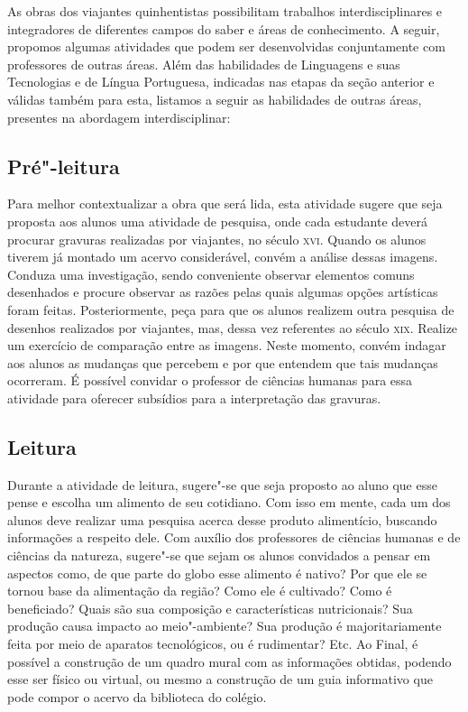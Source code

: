 \documentclass[12pt]{extarticle}
\begin{document}
As obras dos viajantes quinhentistas possibilitam trabalhos
interdisciplinares e integradores de diferentes campos do saber e áreas
de conhecimento. A seguir, propomos algumas atividades que podem ser
desenvolvidas conjuntamente com professores de outras áreas. Além das
habilidades de Linguagens e suas Tecnologias e de Língua Portuguesa,
indicadas nas etapas da seção anterior e válidas também para esta,
listamos a seguir as habilidades de outras áreas, presentes na abordagem
interdisciplinar:


\subsection{Pré"-leitura}

Para melhor contextualizar a obra que será lida, esta
atividade sugere que seja proposta aos alunos uma atividade de pesquisa,
onde cada estudante deverá procurar gravuras realizadas por viajantes,
no século \textsc{xvi}. Quando os alunos tiverem já montado um acervo
considerável, convém a análise dessas imagens. Conduza uma investigação,
sendo conveniente observar elementos comuns desenhados e procure
observar as razões pelas quais algumas opções artísticas foram feitas.
Posteriormente, peça para que os alunos realizem outra pesquisa de
desenhos realizados por viajantes, mas, dessa vez referentes ao século
\textsc{xix}. Realize um exercício de comparação entre as imagens. Neste momento,
convém indagar aos alunos as mudanças que percebem e por que entendem
que tais mudanças ocorreram. É possível convidar o professor de ciências
humanas para essa atividade para oferecer subsídios para a interpretação
das gravuras.

\subsection{Leitura}

Durante a atividade de leitura, sugere"-se que seja proposto ao aluno que
esse pense e escolha um alimento de seu cotidiano. Com isso em mente,
cada um dos alunos deve realizar uma pesquisa acerca desse produto
alimentício, buscando informações a respeito dele. Com auxílio dos
professores de ciências humanas e de ciências da natureza, sugere"-se que
sejam os alunos convidados a pensar em aspectos como, de que parte do
globo esse alimento é nativo? Por que ele se tornou base da alimentação
da região? Como ele é cultivado? Como é beneficiado? Quais são sua
composição e características nutricionais? Sua produção causa impacto ao
meio"-ambiente? Sua produção é majoritariamente feita por meio de
aparatos tecnológicos, ou é rudimentar? Etc. Ao Final, é possível a
construção de um quadro mural com as informações obtidas, podendo esse
ser físico ou virtual, ou mesmo a construção de um guia informativo que
pode compor o acervo da biblioteca do colégio.
\end{document}

